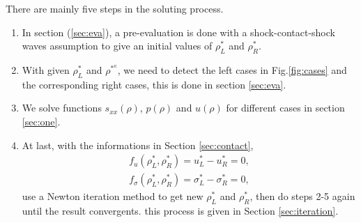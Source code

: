 \documentclass[review]{elsarticle}
\begin{document}
There are mainly five  steps in the soluting process. 
\begin{enumerate}
  \item In section (\ref{sec:eva}), a pre-evaluation is done with a shock-contact-shock waves assumption to give an initial values of $\rho^*_L$ and $\rho^*_R$.  

  \item  With  given $\rho^*_L$ and $\rho^*^_R$, we need to  detect the left cases in Fig.\ref{fig:cases} and the corresponding right cases, this is done in section \ref{sec:eva}.

  \item  We solve functions $s_{xx}(\rho)$, $p(\rho)$ and $u(\rho)$ for  different cases in section \ref{sec:one}.

\item At last,   with  the informations in Section \ref{sec:contact},  
\begin{equation}\label{eq:fus}
  \begin{aligned}
	f_u(\rho^*_L,\rho^*_R) = u_L^* -u_R^* = 0,\\
	f_\sigma(\rho^*_L,\rho^*_R) = \sigma_L^* -\sigma_R^* = 0,
\end{aligned}
\end{equation}
 use a Newton iteration method to  get new $\rho^*_L$ and $\rho^*_R$, then do steps 2-5 again until the result convergents. this process is given in Section \ref{sec:iteration}.
\end{enumerate}
\end{document}
